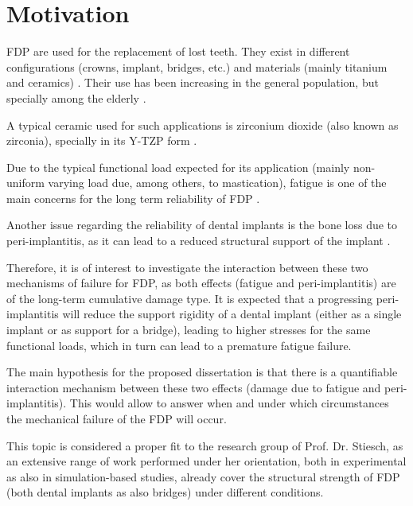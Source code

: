\section{Motivation}
\label{sec:motivation}


\ac{FDP} are used for the replacement of lost teeth.
They exist in different configurations (crowns, implant, bridges, etc.) and materials (mainly titanium and ceramics) \citep{byrne2014}.
Their use has been increasing in the general population, but specially among the elderly \citep{sato2020}.

A typical ceramic used for such applications is zirconium dioxide (also known as zirconia), specially in its \ac{Y-TZP} form \citep{byrne2014, shemtovyona2019}.

Due to the typical functional load expected for its application (mainly non-uniform varying load due, among others, to mastication), fatigue is one of the main concerns for the long term reliability of \ac{FDP} \citep{shemtovyona2016}.

Another issue regarding the reliability of dental implants is the bone loss due to peri-implantitis, as it can lead to a reduced structural support of the implant \citep{byrne2014}.

Therefore, it is of interest to investigate the interaction between these two mechanisms of failure for \ac{FDP}, as both effects (fatigue and peri-implantitis) are of the long-term cumulative damage type.
It is expected that a progressing peri-implantitis will reduce the support rigidity of a dental implant (either as a single implant or as support for a bridge), leading to higher stresses for the same functional loads, which in turn can lead to a premature fatigue failure.

The main hypothesis for the proposed dissertation is that there is a quantifiable interaction mechanism between these two effects (damage due to fatigue and peri-implantitis). 
This would allow to answer when and under which circumstances the mechanical failure of the \ac{FDP} will occur.

This topic is considered a proper fit to the research group of Prof. Dr. Stiesch, as an extensive range of work performed under her orientation, both in  experimental \citep{kohorst2007, herzog2009} as also in simulation-based \citep{dittmer2007, joern2016, rand2017} studies, already cover the structural strength of \ac{FDP} (both dental implants as also bridges) under different conditions.